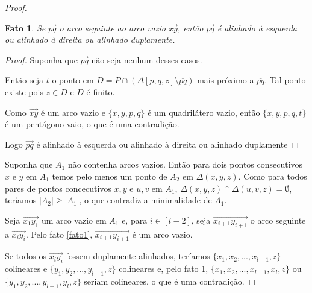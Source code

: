 \documentclass[a4paper]{book}
\newtheorem{fato}{Fato}
\begin{document}
\begin{proof}

    \begin{fato}\label{fato2}
    Se $\overrightarrow{pq}$ o arco seguinte ao arco vazio $\overrightarrow{xy}$, então $\overrightarrow{pq}$ é alinhado à esquerda ou alinhado à direita ou alinhado duplamente.
    \end{fato}
    \begin{proof}
        Suponha que $\overrightarrow{pq}$ não seja nenhum desses casos.

        Então seja $t$ o ponto em $D=P\cap(\Delta[p,q,z]\setminus\overline{pq})$ mais próximo a $\overline{pq}$. Tal ponto existe pois $z\in D$ e $D$ é finito.
        
        Como $\overrightarrow{xy}$ é um arco vazio e $\{x,y,p,q\}$ é um quadrilátero vazio, então $\{x,y,p,q,t\}$ é um pentágono vaio, o que é uma contradição.

        Logo $\overrightarrow{pq}$ é alinhado à esquerda ou alinhado à direita ou alinhado duplamente
    \end{proof}
    Suponha que $A_1$ não contenha arcos vazios. Então para dois pontos consecutivos $x$ e $y$ em $A_1$ temos pelo menos um ponto de $A_2$ em $\Delta(x,y,z)$. Como para todos pares de pontos concecutivos $x,y$ e $u,v$ em $A_1$, $\Delta(x,y,z)\cap\Delta(u,v,z)=\emptyset$, teríamos $|A_2|\geq|A_1|$, o que contradiz a minimalidade de $A_1$.

    Seja $\overrightarrow{x_1y_1}$ um arco vazio em $A_1$ e, para $i\in[l-2]$, seja $\overrightarrow{x_{i+1}y_{i+1}}$ o arco seguinte a $\overrightarrow{x_iy_i}$. Pelo fato \ref{fato1}, $\overrightarrow{x_{i+1}y_{i+1}}$ é um arco vazio.

    Se todos os $\overrightarrow{x_iy_i}$ fossem duplamente alinhados, teríamos $\{x_1,x_2,...,x_{l-1},z\}$ colineares e $\{y_1,y_2,...,y_{l-1},z\}$ colineares e, pelo fato \ref{fato2}, $\{x_1,x_2,...,x_{l-1},x_l,z\}$ ou $\{y_1,y_2,...,y_{l-1},y_l,z\}$ seriam colineares, o que é uma contradição.


\end{proof}
\end{document}
